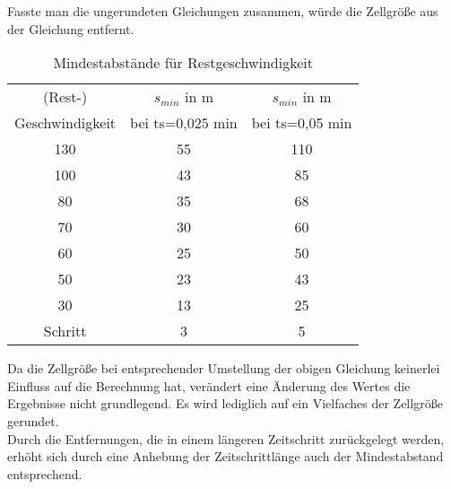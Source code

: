 Fasste man die ungerundeten Gleichungen zusammen, würde die Zellgröße aus der Gleichung entfernt.

\begin{table}[ht]
\begin{center}
\setlength{\tabcolsep}{0.5em} %
{\renewcommand{\arraystretch}{1.2}%
\begin{tabular}{| c  c  c |}
\hline 
(Rest-) & $ s_{min} $ in m & $ s_{min} $ in m  \\ 
Geschwindigkeit & bei ts=0,025 min & bei ts=0,05 min \\ \hline 
130 & 55 & 110 \\ 
100 & 43 & 85 \\ 
80 & 35 & 68 \\ 
70 & 30 & 60 \\ 
60 & 25 & 50 \\ 
50 & 23 & 43 \\ 
30 & 13 & 25 \\ 
Schritt & 3 & 5 \\ \hline
\end{tabular}
}
\caption{Mindestabstände für Restgeschwindigkeit}
\label{tab:restgeschw-abstand}
\end{center}
\end{table}

Da die Zellgröße bei entsprechender Umstellung der obigen Gleichung keinerlei Einfluss auf die Berechnung hat, verändert eine Änderung des Wertes die Ergebnisse nicht grundlegend. 
Es wird lediglich auf ein Vielfaches der Zellgröße gerundet.
\\
Durch die Entfernungen, die in einem längeren Zeitschritt zurückgelegt werden, erhöht sich durch eine Anhebung der Zeitschrittlänge auch der Mindestabstand entsprechend.

